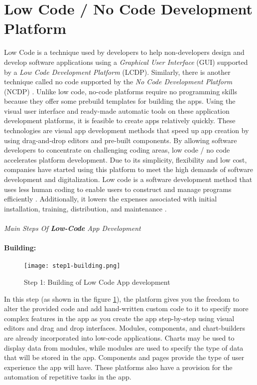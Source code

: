 \section{Low Code / No Code Development Platform}
\label{background:section:lowcode}
Low Code is a technique used by developers to help non-developers design and develop software applications using a \textit{Graphical User Interface} (GUI) supported by a \textit{Low Code Development Platform} (LCDP).
Similarly, there is another technique called no code supported by the \textit{No Code Development Platform} (NCDP) \cite{article:nocode:miller}.
Unlike low code, no-code platforms require no programming skills because they offer some prebuild templates for building the apps.
Using the visual user interface and ready-made automatic tools on these application development platforms, it is feasible to create apps relatively quickly. 
These technologies are visual app development methods that speed up app creation by using drag-and-drop editors and pre-built components. 
By allowing software developers to concentrate on challenging coding areas, low code / no code accelerates platform development.
Due to its simplicity, flexibility and low cost, companies have started using this platform to meet the high demands of software development and digitalization.
Low code is a software development method that uses less human coding to enable users to construct and manage programs efficiently \cite{article:nocode:sahina}.
Additionally, it lowers the expenses associated with initial installation, training, distribution, and maintenance \cite{article:nocode:sanchi}.\\ \\
\textit{Main Steps Of \textbf{Low-Code} App Development}
\paragraph*{Building:}
\begin{figure}[htbp!]
  \centering    
  \texttt{[image: step1-building.png]}
  \caption[Building]{Step 1: Building of Low Code App development}
  \label{fig:background:building}
\end{figure}
In this step (as shown in the figure \ref{fig:background:building}), the platform gives you the freedom to alter the provided code and add hand-written custom code to it to specify more complex features in the app as you create the app step-by-step using visual editors and drag and drop interfaces.
Modules, components, and chart-builders are already incorporated into low-code applications. 
Charts may be used to display data from modules, while modules are used to specify the type of data that will be stored in the app. 
Components and pages provide the type of user experience the app will have.
These platforms also have a provision for the automation of repetitive tasks in the app.
